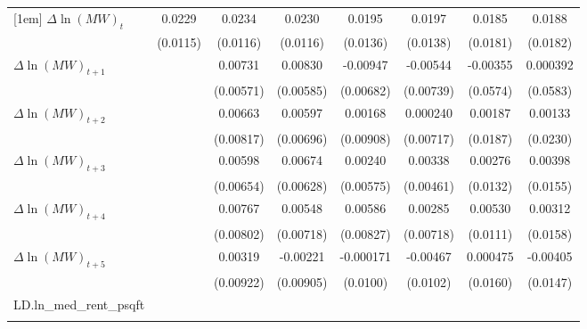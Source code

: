 {\begin{tabular}{l*{7}{c}}
[1em]
$\Delta \ln(MW)_{t}$&   0.0229\sym{*}  &   0.0234\sym{**} &   0.0230\sym{*}  &   0.0195         &   0.0197         &   0.0185         &   0.0188         \\
          & (0.0115)         & (0.0116)         & (0.0116)         & (0.0136)         & (0.0138)         & (0.0181)         & (0.0182)         \\
[1em]
$\Delta \ln(MW)_{t+1}$&                  &  0.00731         &  0.00830         & -0.00947         & -0.00544         & -0.00355         & 0.000392         \\
          &                  &(0.00571)         &(0.00585)         &(0.00682)         &(0.00739)         & (0.0574)         & (0.0583)         \\
[1em]
$\Delta \ln(MW)_{t+2}$&                  &  0.00663         &  0.00597         &  0.00168         & 0.000240         &  0.00187         &  0.00133         \\
          &                  &(0.00817)         &(0.00696)         &(0.00908)         &(0.00717)         & (0.0187)         & (0.0230)         \\
[1em]
$\Delta \ln(MW)_{t+3}$&                  &  0.00598         &  0.00674         &  0.00240         &  0.00338         &  0.00276         &  0.00398         \\
          &                  &(0.00654)         &(0.00628)         &(0.00575)         &(0.00461)         & (0.0132)         & (0.0155)         \\
[1em]
$\Delta \ln(MW)_{t+4}$&                  &  0.00767         &  0.00548         &  0.00586         &  0.00285         &  0.00530         &  0.00312         \\
          &                  &(0.00802)         &(0.00718)         &(0.00827)         &(0.00718)         & (0.0111)         & (0.0158)         \\
[1em]
$\Delta \ln(MW)_{t+5}$&                  &  0.00319         & -0.00221         &-0.000171         & -0.00467         & 0.000475         & -0.00405         \\
          &                  &(0.00922)         &(0.00905)         & (0.0100)         & (0.0102)         & (0.0160)         & (0.0147)         \\
[1em]
LD.ln_med_rent_psqft&                  &                  &                  &                  &                  &                  &                  \\
          &                  &                  &                  &                  &                  &                  &                  \\

\end{tabular}}
